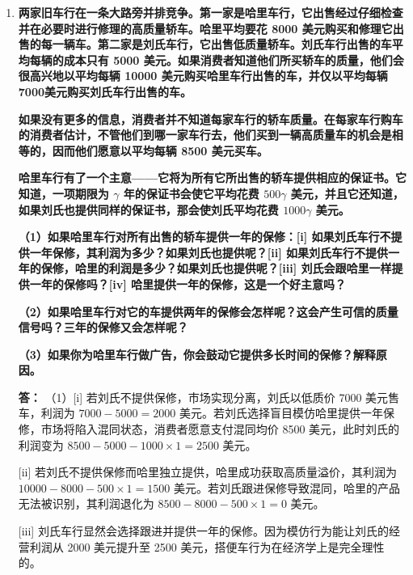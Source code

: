 \begin{enumerate}[label=\textbf{\arabic*.}, leftmargin=*]
		（4）不同意。若政府强制所有企业提供相同力度的保修，将导致市场信号机制彻底失效。
		这把原本可以实现分离均衡的排他性发信工具强行扭曲为混同均衡，消费者将无法通过保修单鉴别品质优劣。
		同时，这也粗暴阻断了低质产品通过放弃保修来维持低价竞争优势的正常商业逻辑。
		
		\item \textbf{两家旧车行在一条大路旁并排竞争。第一家是哈里车行，它出售经过仔细检查并在必要时进行修理的高质量轿车。哈里平均要花 8000 美元购买和修理它出售的每一辆车。第二家是刘氏车行，它出售低质量轿车。刘氏车行出售的车平均每辆的成本只有 5000 美元。如果消费者知道他们所买轿车的质量，他们会很高兴地以平均每辆 10000 美元购买哈里车行出售的车，并仅以平均每辆 7000美元购买刘氏车行出售的车。}
		
		\textbf{如果没有更多的信息，消费者并不知道每家车行的轿车质量。在每家车行购车的消费者估计，不管他们到哪一家车行去，他们买到一辆高质量车的机会是相等的，因而他们愿意以平均每辆 8500 美元买车。}
		
		\textbf{哈里车行有了一个主意——它将为所有它所出售的轿车提供相应的保证书。它知道，一项期限为 $\gamma$ 年的保证书会使它平均花费 $500\gamma$ 美元，并且它还知道，如果刘氏也提供同样的保证书，那会使刘氏平均花费 $1000\gamma$ 美元。}
		
		\textbf{（1）如果哈里车行对所有出售的轿车提供一年的保修：[i] 如果刘氏车行不提供一年保修，其利润为多少？如果刘氏也提供呢？[ii] 如果刘氏车行不提供一年的保修，哈里的利润是多少？如果刘氏也提供呢？[iii] 刘氏会跟哈里一样提供一年的保修吗？[iv] 哈里提供一年的保修，这是一个好主意吗？}
		
		\textbf{（2）如果哈里车行对它的车提供两年的保修会怎样呢？这会产生可信的质量信号吗？三年的保修又会怎样呢？}
		
		\textbf{（3）如果你为哈里车行做广告，你会鼓动它提供多长时间的保修？解释原因。}
		
		\textbf{答：} （1）[i] 若刘氏不提供保修，市场实现分离，刘氏以低质价 7000 美元售车，利润为 $7000 - 5000 = 2000$ 美元。若刘氏选择盲目模仿哈里提供一年保修，市场将陷入混同状态，消费者愿意支付混同均价 8500 美元，此时刘氏的利润变为 $8500 - 5000 - 1000 \times 1 = 2500$ 美元。
		
		[ii] 若刘氏不提供保修而哈里独立提供，哈里成功获取高质量溢价，其利润为 $10000 - 8000 - 500 \times 1 = 1500$ 美元。若刘氏跟进保修导致混同，哈里的产品无法被识别，其利润退化为 $8500 - 8000 - 500 \times 1 = 0$ 美元。
		
		[iii] 刘氏车行显然会选择跟进并提供一年的保修。因为模仿行为能让刘氏的经营利润从 2000 美元提升至 2500 美元，搭便车行为在经济学上是完全理性的。
		

\end{enumerate}
